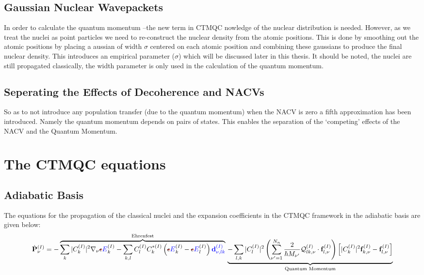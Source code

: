 \subsection{Gaussian Nuclear Wavepackets}
In order to calculate the quantum momentum --the new term in CTMQC nowledge of the nuclear distribution is needed. However, as we treat the nuclei as point particles we need to re-construct the nuclear density from the atomic positions. This is done by smoothing out the atomic positions by placing a aussian of width $\sigma$ centered on each atomic position and combining these gaussians to produce the final nuclear density. This introduces an empirical parameter ($\sigma$) which will be discussed later in this thesis. It should be noted, the nuclei are still propagated classically, the width parameter is only used in the calculation of the quantum momentum.
\subsection{Seperating the Effects of Decoherence and NACVs}
So as to not introduce any population transfer (due to the quantum momentum) when the NACV is zero a fifth approximation has been introduced. Namely the quantum momentum depends on pairs of states\replace{ --}{, }. This enables the separation of the `competing' effects of the NACV and the Quantum Momentum.
\section{The CTMQC equations}
\subsection{Adiabatic Basis}
\label{sec:ad_eqns}
The equations for the propagation of the classical nuclei and the expansion coefficients in the CTMQC framework in the adiabatic basis are given below:
\begin{dmath}
  \dot{\mathbf{P}}_{\nu}^{(I)} =
  -\overbrace{
     \sum_{k} |C_{k}^{(I)}|^2 \nabla_{\nu}\mremove{\epsilon}\madd{E}_{k}^{(I)}
	 - \sum_{k,l} C_{l}^{(I)} C_{k}^{* (I)} \left(\mremove{\epsilon}\madd{E}_{k}^{(I)}  - \mremove{\epsilon}\madd{E}_{l}^{(I)}   \right) \madd{\mathbf{d}_{\nu, lk}^{(I)}}
  }^{\text{Ehrenfest}}
  \\
  \underbrace{
    - \sum_{l,k} |C_{l}^{(I)}|^2 \left( \sum_{\nu'=1}^{N_n}    \frac{2}{\hbar M_{\nu'}} \mathcal{Q}_{lk, \nu}^{(I)} \cdot    \mathbf{f}_{l, \nu}^{(I)} \right)\left[ |C_{k}^{(I)}|^2    \mathbf{f}_{k,\nu}^{(I)} - \mathbf{f}_{l,\nu}^{(I)} \right]
  }_{\text{Quantum Momentum}}
    \label{eq:nuc_adiab}
\end{dmath}

